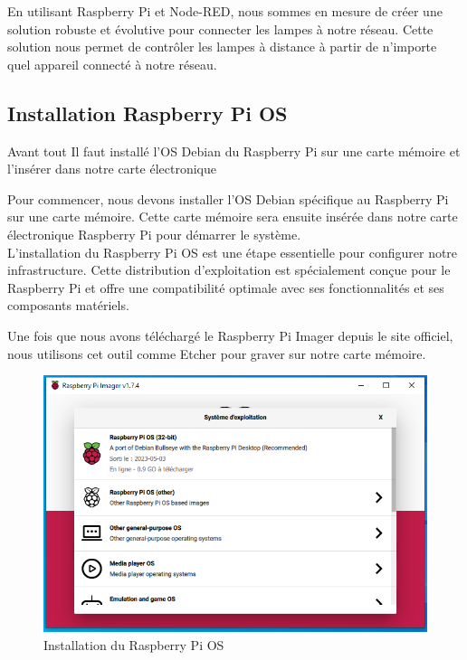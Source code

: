 En utilisant Raspberry Pi et Node-RED, nous sommes en mesure de créer une solution robuste et évolutive pour connecter les lampes à notre réseau. Cette solution nous permet de contrôler les lampes à distance à partir de n'importe quel appareil connecté à notre réseau. \\


\subsection{Installation Raspberry Pi OS}

Avant tout Il faut installé l'OS Debian du Raspberry Pi sur une carte mémoire et l'insérer dans notre carte électronique 



Pour commencer, nous devons installer l'OS Debian spécifique au Raspberry Pi sur une carte mémoire. Cette carte mémoire sera ensuite insérée dans notre carte électronique Raspberry Pi pour démarrer le système. \\

L'installation du Raspberry Pi OS est une étape essentielle pour configurer notre infrastructure. Cette distribution d'exploitation est spécialement conçue pour le Raspberry Pi et offre une compatibilité optimale avec ses fonctionnalités et ses composants matériels.


Une fois que nous avons téléchargé le Raspberry Pi Imager depuis le site officiel, nous utilisons cet outil comme Etcher pour graver sur notre carte mémoire. 


\begin{figure}[H]
 \centering
    \includegraphics[width=15cm]{Images/RaspberryPiOSInstall1.png}
    \caption{Installation du Raspberry Pi OS}
    \label{Chap4.3.1}
\end{figure}    
\smallskip

